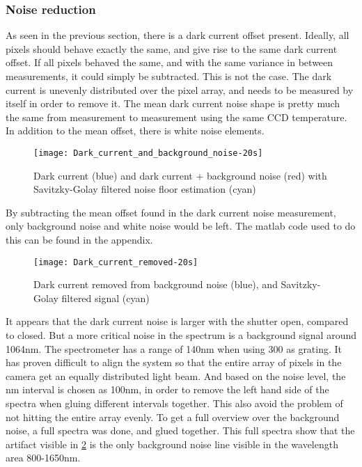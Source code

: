 \subsubsection{Noise reduction}

As seen in the previous section, there is a dark current offset present. Ideally, all pixels should behave exactly the same, and give rise to the same dark current offset. If all pixels behaved the same, and with the same variance in between measurements, it could simply be subtracted. This is not the case. The dark current is unevenly distributed over the pixel array, and needs to be measured by itself in order to remove it. The mean dark current noise shape is pretty much the same from measurement to measurement using the same CCD temperature. In addition to the mean offset, there is white noise elements. 

\begin{figure}[H]
\centering
\texttt{[image: Dark\_current\_and\_background\_noise-20s]}
\caption[Dark current and noise]{Dark current (blue) and dark current + background noise (red) with Savitzky-Golay filtered noise floor estimation (cyan)}%
\label{fig:dark_current_and_background_noise}%
\end{figure}

By subtracting the mean offset found in the dark current noise measurement, only background noise and white noise would be left. The matlab code used to do this can be found in the appendix.

\begin{figure}[H]
\centering
\texttt{[image: Dark\_current\_removed-20s]}
\caption[Dark current removed]{Dark current removed from background noise (blue), and Savitzky-Golay filtered signal (cyan)}%
\label{fig:dark_current_removed-20s}%
\end{figure}

It appears that the dark current noise is larger with the shutter open, compared to closed. But a more critical noise in the spectrum is a background signal around 1064nm. The spectrometer has a range of 140nm when using 300 as grating. It has proven difficult to align the system so that the entire array of pixels in the camera get an equally distributed light beam. And based on the noise level, the nm interval is chosen as 100nm, in order to remove the left hand side of the spectra when gluing different intervals together. This also avoid the problem of not hitting the entire array evenly. To get a full overview over the background noise, a full spectra was done, and glued together. This full spectra show that the artifact visible in \ref{fig:dark_current_removed-20s} is the only background noise line visible in the wavelength area 800-1650nm.


